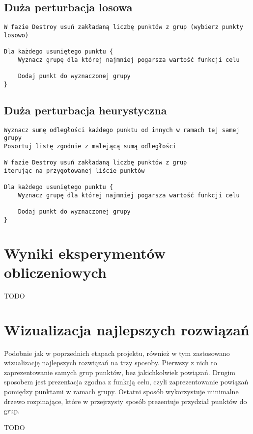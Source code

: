 \documentclass[main.tex]{subfiles}
\begin{document}
\subsection{Duża perturbacja losowa}
\begin{verbatim}
W fazie Destroy usuń zakładaną liczbę punktów z grup (wybierz punkty losowo)

Dla każdego usuniętego punktu {
    Wyznacz grupę dla której najmniej pogarsza wartość funkcji celu

    Dodaj punkt do wyznaczonej grupy
}
\end{verbatim}

\subsection{Duża perturbacja heurystyczna}
\begin{verbatim}
Wyznacz sumę odległości każdego punktu od innych w ramach tej samej grupy
Posortuj listę zgodnie z malejącą sumą odległości

W fazie Destroy usuń zakładaną liczbę punktów z grup
iterując na przygotowanej liście punktów

Dla każdego usuniętego punktu {
    Wyznacz grupę dla której najmniej pogarsza wartość funkcji celu

    Dodaj punkt do wyznaczonej grupy
}
\end{verbatim}

\section{Wyniki eksperymentów obliczeniowych}
\label{section:wyniki}
TODO

\section{Wizualizacja najlepszych rozwiązań}
Podobnie jak w poprzednich etapach projektu, również w tym zastosowano wizualizację najlepszych rozwiązań na trzy sposoby. Pierwszy z nich to zaprezentowanie samych grup punktów, bez jakichkolwiek powiązań. Drugim sposobem jest prezentacja zgodna z funkcją celu, czyli zaprezentowanie powiązań pomiędzy punktami w ramach grupy. Ostatni sposób wykorzystuje minimalne drzewo rozpinające, które w przejrzysty sposób prezentuje przydział punktów do grup.

TODO
\end{document}
